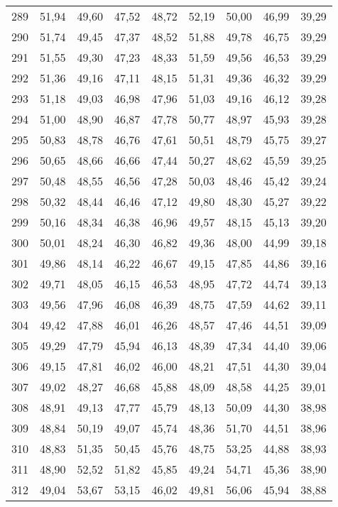 \begin{longtable}{c c c c c c c c c}
289	& 51,94	& 49,60	& 47,52	& 48,72	& 52,19	& 50,00	& 46,99	& 39,29 \\
290	& 51,74	& 49,45	& 47,37	& 48,52	& 51,88	& 49,78	& 46,75	& 39,29 \\
291	& 51,55	& 49,30	& 47,23	& 48,33	& 51,59	& 49,56	& 46,53	& 39,29 \\
292	& 51,36	& 49,16	& 47,11	& 48,15	& 51,31	& 49,36	& 46,32	& 39,29 \\
293	& 51,18	& 49,03	& 46,98	& 47,96	& 51,03	& 49,16	& 46,12	& 39,28 \\
294	& 51,00	& 48,90	& 46,87	& 47,78	& 50,77	& 48,97	& 45,93	& 39,28 \\
295	& 50,83	& 48,78	& 46,76	& 47,61	& 50,51	& 48,79	& 45,75	& 39,27 \\
296	& 50,65	& 48,66	& 46,66	& 47,44	& 50,27	& 48,62	& 45,59	& 39,25 \\
297	& 50,48	& 48,55	& 46,56	& 47,28	& 50,03	& 48,46	& 45,42	& 39,24 \\
298	& 50,32	& 48,44	& 46,46	& 47,12	& 49,80	& 48,30	& 45,27	& 39,22 \\
299	& 50,16	& 48,34	& 46,38	& 46,96	& 49,57	& 48,15	& 45,13	& 39,20 \\
300	& 50,01	& 48,24	& 46,30	& 46,82	& 49,36	& 48,00	& 44,99	& 39,18 \\
301	& 49,86	& 48,14	& 46,22	& 46,67	& 49,15	& 47,85	& 44,86	& 39,16 \\
302	& 49,71	& 48,05	& 46,15	& 46,53	& 48,95	& 47,72	& 44,74	& 39,13 \\
303	& 49,56	& 47,96	& 46,08	& 46,39	& 48,75	& 47,59	& 44,62	& 39,11 \\
304	& 49,42	& 47,88	& 46,01	& 46,26	& 48,57	& 47,46	& 44,51	& 39,09 \\
305	& 49,29	& 47,79	& 45,94	& 46,13	& 48,39	& 47,34	& 44,40	& 39,06 \\
306	& 49,15	& 47,81	& 46,02	& 46,00	& 48,21	& 47,51	& 44,30	& 39,04 \\
307	& 49,02	& 48,27	& 46,68	& 45,88	& 48,09	& 48,58	& 44,25	& 39,01 \\
308	& 48,91	& 49,13	& 47,77	& 45,79	& 48,13	& 50,09	& 44,30	& 38,98 \\
309	& 48,84	& 50,19	& 49,07	& 45,74	& 48,36	& 51,70	& 44,51	& 38,96 \\
310	& 48,83	& 51,35	& 50,45	& 45,76	& 48,75	& 53,25	& 44,88	& 38,93 \\
311	& 48,90	& 52,52	& 51,82	& 45,85	& 49,24	& 54,71	& 45,36	& 38,90 \\
312	& 49,04	& 53,67	& 53,15	& 46,02	& 49,81	& 56,06	& 45,94	& 38,88 \\

\end{longtable}
